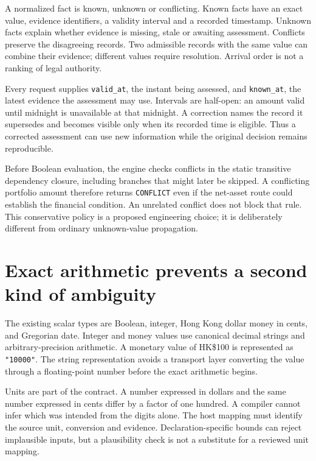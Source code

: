 A normalized fact is known, unknown or conflicting. Known facts have an exact
value, evidence identifiers, a validity interval and a recorded timestamp.
Unknown facts explain whether evidence is missing, stale or awaiting assessment.
Conflicts preserve the disagreeing records. Two admissible records with the
same value can combine their evidence; different values require resolution.
Arrival order is not a ranking of legal authority.

Every request supplies \texttt{valid\_at}, the instant being assessed, and
\texttt{known\_at}, the latest evidence the assessment may use. Intervals are
half-open: an amount valid until midnight is unavailable at that midnight.
A correction names the record it supersedes and becomes visible only when its
recorded time is eligible. Thus a corrected assessment can use new information
while the original decision remains reproducible.


Before Boolean evaluation, the engine checks conflicts in the static transitive
dependency closure, including branches that might later be skipped. A conflicting
portfolio amount therefore returns \texttt{CONFLICT} even if the net-asset route
could establish the financial condition. An unrelated conflict does not block
that rule. This conservative policy is a proposed engineering choice; it is
deliberately different from ordinary unknown-value propagation.

\section{Exact arithmetic prevents a second kind of ambiguity}
\label{merge:M07:02}


The existing scalar types are Boolean, integer, Hong Kong dollar money in cents,
and Gregorian date. Integer and money values use canonical decimal strings and
arbitrary-precision arithmetic. A monetary value of HK\$100 is represented as
\texttt{"10000"}. The string representation avoids a transport layer converting
the value through a floating-point number before the exact arithmetic begins.

Units are part of the contract. A number expressed in dollars and the same number
expressed in cents differ by a factor of one hundred. A compiler cannot infer
which was intended from the digits alone. The host mapping must identify the
source unit, conversion and evidence. Declaration-specific bounds can reject
implausible inputs, but a plausibility check is not a substitute for a reviewed
unit mapping.

